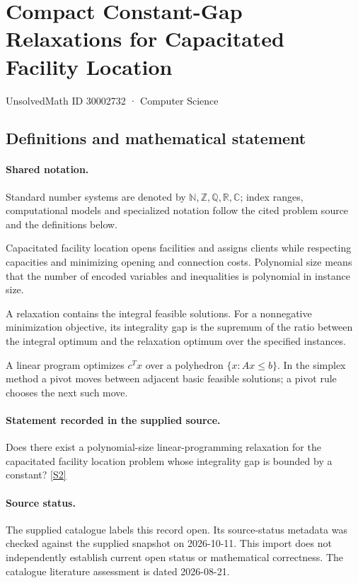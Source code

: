 \documentclass[11pt]{article}
\newcommand{\sref}[2]{\hyperlink{source:#1:#2}{[S#2]}}
\begin{document}
\setcounter{section}{30002731}
\section{Compact Constant-Gap Relaxations for Capacitated Facility Location}\label{30002732}
{\small\sffamily UnsolvedMath ID 30002732 · Computer Science}
\subsection{Definitions and mathematical statement}

\paragraph{Shared notation.}Standard number systems are denoted by $\mathbb N,\mathbb Z,\mathbb Q,\mathbb R,\mathbb C$; index ranges, computational models and specialized notation follow the cited problem source and the definitions below.


Capacitated facility location opens facilities and assigns clients while respecting capacities and minimizing opening and connection costs. Polynomial size means that the number of encoded variables and inequalities is polynomial in instance size.

A relaxation contains the integral feasible solutions. For a nonnegative minimization objective, its integrality gap is the supremum of the ratio between the integral optimum and the relaxation optimum over the specified instances.

A linear program optimizes $c^Tx$ over a polyhedron $\{x:Ax\leq b\}$. In the simplex method a pivot moves between adjacent basic feasible solutions; a pivot rule chooses the next such move.
\paragraph{Statement recorded in the supplied source.}
Does there exist a polynomial-size linear-programming relaxation for the capacitated facility location problem whose integrality gap is bounded by a constant? \sref{30002732}{2}
\paragraph{Source status.}
The supplied catalogue labels this record open. Its source-status metadata was checked against the supplied snapshot on 2026-10-11. This import does not independently establish current open status or mathematical correctness. The catalogue literature assessment is dated 2026-08-21.
\end{document}
